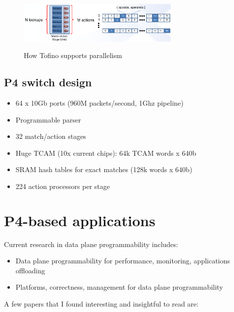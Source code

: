\documentclass[11pt,oneside,a4paper]{article}
\begin{document}
\begin{figure}[hb]
	\centering
	\includegraphics[width=0.7\textwidth,scale=1]{figures/tofino_parallelism_phv}
	\label{fig:tofino_parallelism_phv}
	\caption{How Tofino supports parallelism \cite{barefoot}}
\end{figure}

\newpage

\subsection{P4 switch design}


\begin{itemize}
	\setlength{\itemsep}{0pt}
	\setlength{\parskip}{0pt}
	\item 64 x 10Gb ports (960M packets/second, 1Ghz pipeline)
	\item Programmable parser
	\item 32 match/action stages
	\item Huge TCAM (10x current chips): 64k TCAM words x 640b
	\item SRAM hash tables for exact matches (128k words x 640b)
	\item 224 action processors per stage
\end{itemize}
\vspace{-\topsep}

\section{P4-based applications}

Current research in data plane programmability includes:

\vspace{-\topsep}
\begin{itemize}
	\setlength{\itemsep}{0pt}
	\setlength{\parskip}{0pt}
	\item Data plane programmability for performance, monitoring, applications offloading
	\item Platforms, correctness, management for data plane programmability
\end{itemize}
\vspace{-\topsep}

\noindent A few papers that I found interesting and insightful to read are:
\end{document}
